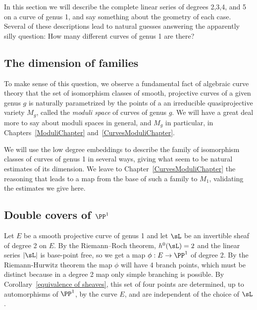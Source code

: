 In this section we will describe the complete linear series of degrees 2,3,4, and 5 on a curve of genus 1, and say something
about the geometry of each case. Several of these descriptions lead to natural guesses answering the
apparently silly question: How many different curves of genus 1 are there? 

\subsection {The dimension of families}

To make sense of this question, we observe a fundamental fact of algebraic curve theory that the set of isomorphism classes of smooth, projective curves of a given genus $g$ is naturally parametrized by the points of a
an irreducible quasiprojective variety $M_g$, called the \emph{moduli space} of curves of genus $g$. We will have a great deal more to say about moduli spaces in general, and $M_g$ in particular, in Chapters~\ref{ModuliChapter} and~\ref{CurvesModuliChapter}. 

We will use the low degree embeddings  to describe the family of isomorphism classes of curves of genus 1 in several ways, giving
what seem to be natural estimates of its dimension. We leave to Chapter~\ref{CurvesModuliChapter} the reasoning that leads to a map from the base of such a family to $M_{1}$, validating the estimates we give here.

\subsection{Double covers of $\PP^1$}

Let $E$ be a smooth projective curve of genus 1 and let  $\sL$ be an invertible sheaf of degree 2 on $E$. By the Riemann--Roch theorem, $h^0(\sL) = 2$ and the linear series $|\sL|$ is base-point free, so we get a map $\phi : E \to \PP^1$ of degree 2. By the Riemann-Hurwitz theorem the map $\phi$ will have 4 branch points, which must be distinct because in a degree 2 map
only simple branching is possible. By Corollary~\ref{equivalence of sheaves}, this set of four points are determined, up to automorphisms of $\PP^1$, by the curve $E$, and are independent of the choice of $\sL$. 


